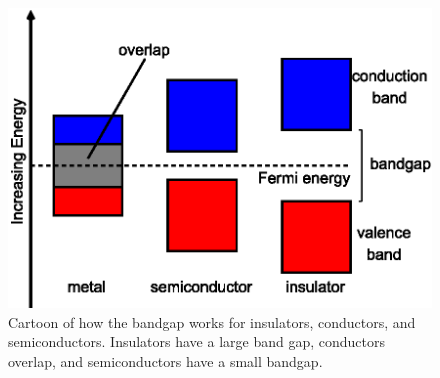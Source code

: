 \begin{figure}
    \centering
    \includegraphics[scale=1]{Setup_Figs/semiconductor.eps}
    \caption{Cartoon of how the bandgap works for insulators, conductors, and semiconductors. Insulators have a large band gap, conductors overlap, and semiconductors have a small bandgap.}
    \label{fig:bandgap}
\end{figure}